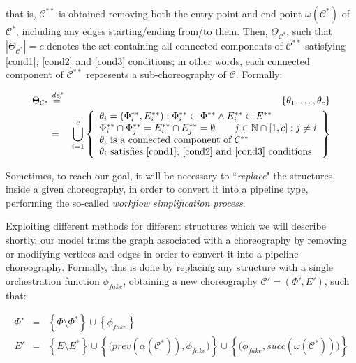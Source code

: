 \documentclass[12pt,a4paper]{report}
\newcommand{\mathDef}{\overset{\textit{def}}{=}}
\newcommand{\N}{\mathbb{N}}
\newcommand{\SetFromOneTo}[1]{\N \cap \left[1,#1\right]}
\newcommand{\ItalicQuotMark}[1]{``\textit{#1}"}
\begin{document}
that is, $\mathcal{C}^{**}$ is obtained removing both the entry point and end point $\omega(\mathcal{C}^*)$ of $\mathcal{C}^{*}$, including any edges starting/ending from/to them. Then, $\Theta_{\mathcal{C}^*}$, such that $|\Theta_{\mathcal{C}^*}| = c$ denotes the set containing all connected components of $\mathcal{C}^{**}$ satisfying \ref{cond1}, \ref{cond2} and \ref{cond3} conditions; in other words, each connected component of $\mathcal{C}^{**}$ represents a sub-choreography of $\mathcal{C}$. Formally:

\begin{eqnarray}
	\Theta_{\mathcal{C}^*} & \mathDef & \left\lbrace \theta_1, \ldots ,\theta_c \right\rbrace \\ & = & \bigcup_{i = 1}^c \left\{ \begin{array}{l}
		\theta_i = (\Phi^{**}_i, E^{**}_i) : \Phi^{**}_i \subset \Phi^{**} \wedge E^{**}_i \subset E^{**} \\ 
		\Phi^{**}_i \cap \Phi^{**}_j = E^{**}_i \cap E^{**}_j = \emptyset \qquad j \in \SetFromOneTo{c}: j \neq i \\
		\text{$\theta_i$ is a connected component of $\mathcal{C}^{**}$} \\	
		\text{$\theta_i$ satisfies \ref{cond1}, \ref{cond2} and \ref{cond3} conditions}
	\end{array} \right\} \nonumber
\end{eqnarray}

Sometimes, to reach our goal, it will be necessary to \ItalicQuotMark{replace} the structures, inside a given choreography, in order to convert it into a pipeline type, performing the so-called \textit{workflow simplification process}.

Exploiting different methods for different structures which we will describe shortly, our model trims the graph associated with a choreography by removing or modifying vertices and edges in order to convert it into a pipeline choreography. Formally, this is done by replacing any structure with a single orchestration function $\phi_{fake}$, obtaining a new choreography $\mathcal{C}' = (\Phi',E')$, such that:

\begin{eqnarray}
	\Phi' & = & \left\{ \Phi \setminus \Phi^* \right\} \cup \left\{ \phi_{fake} \right\} \\
	E' & = & \left\{ E \setminus E^* \right\} \cup \left\{\bigg(prev(\alpha(\mathcal{C}^*)), \phi_{fake}\bigg) \right\} \cup \left\{\bigg(\phi_{fake}, succ(\omega(\mathcal{C}^*)) \bigg) \right\}
\end{eqnarray}
\end{document}
